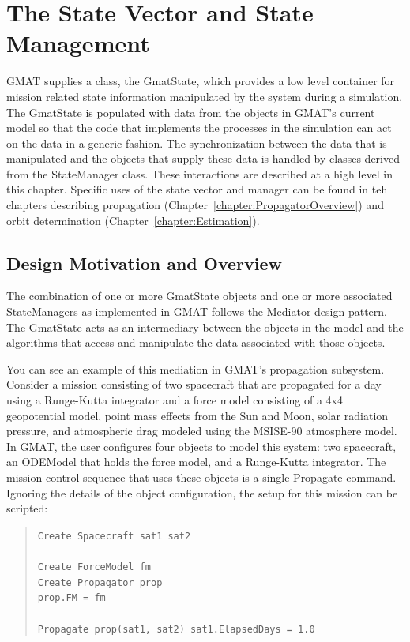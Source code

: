 \chapter{\label{chapter:PropagatorStates}The State Vector and State Management}

GMAT supplies a class, the GmatState, which provides a low level container for mission related
state information manipulated by the system during a simulation.  The GmatState is populated with
data from the objects in GMAT's current model so that the code that implements the processes in the
simulation can act on the data in a generic fashion.  The synchronization between the data that
is manipulated and the objects that supply these data is handled by classes derived from the
StateManager class.  These interactions are described at a high level in this chapter.  Specific
uses of the state vector and manager can be found in teh chapters describing propagation
(Chapter~\ref{chapter:PropagatorOverview}) and orbit determination
(Chapter~\ref{chapter:Estimation}).

\section{Design Motivation and Overview}

The combination of one or more GmatState objects and one or more associated StateManagers as
implemented in GMAT follows the Mediator design pattern.  The GmatState acts as an intermediary
between the objects in the model and the algorithms that access and manipulate the data associated
with those objects.

You can see an example of this mediation in GMAT's propagation subsystem.  Consider a mission
consisting of two spacecraft that are propagated for a day using a Runge-Kutta integrator and a
force model consisting of a 4x4 geopotential model, point mass effects from the Sun and Moon, solar
radiation pressure, and atmospheric drag modeled using the MSISE-90 atmosphere model.  In GMAT, the
user configures four objects to model this system: two spacecraft, an ODEModel that holds the force
model, and a Runge-Kutta integrator.  The mission control sequence that uses these objects is a
single Propagate command.  Ignoring the details of the object configuration, the setup for this
mission can be scripted:

\begin{quote}
\texttt{Create Spacecraft sat1 sat2\\
\\
Create ForceModel fm\\
Create Propagator prop\\
prop.FM = fm\\
\\
Propagate prop(sat1, sat2) {sat1.ElapsedDays = 1.0}}
\end{quote}

